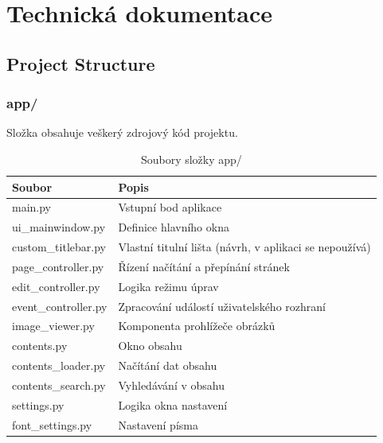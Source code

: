 \documentclass[FM,Proj]{tulthesis}
\begin{document}
\chapter{Technická dokumentace}

\section{Project Structure}


\subsection{app/}

Složka obsahuje veškerý zdrojový kód projektu.

\begin{table}[H]
	\centering
	\caption{Soubory složky app/}
	\begin{tabularx}{\textwidth}{|l|X|}
		\hline
		\textbf{Soubor} & \textbf{Popis} \\ \hline
		main.py              & Vstupní bod aplikace \\ \hline
		ui\_mainwindow.py    & Definice hlavního okna \\ \hline
		custom\_titlebar.py  & Vlastní titulní lišta (návrh, v aplikaci se nepoužívá) \\ \hline
		page\_controller.py  & Řízení načítání a přepínání stránek \\ \hline
		edit\_controller.py  & Logika režimu úprav \\ \hline
		event\_controller.py & Zpracování událostí uživatelského rozhraní \\ \hline
		image\_viewer.py     & Komponenta prohlížeče obrázků \\ \hline
		contents.py          & Okno obsahu \\ \hline
		contents\_loader.py  & Načítání dat obsahu \\ \hline
		contents\_search.py  & Vyhledávání v obsahu \\ \hline
		settings.py          & Logika okna nastavení \\ \hline
		font\_settings.py    & Nastavení písma \\ \hline
	\end{tabularx}
	\label{tab:app-files}
\end{table}
\end{document}
